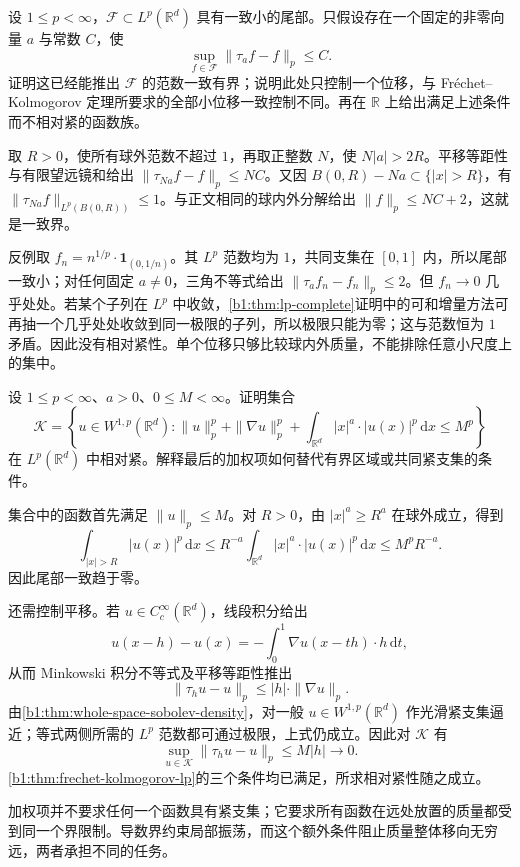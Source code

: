 \begin{exercise}\label{b1:ex:25-fk-redundant-boundedness}
设 \(1\le p<\infty\)，\(\mathcal F\subset L^p(\mathbb R^d)\) 具有一致小的尾部。只假设存在一个固定的非零向量 \(a\) 与常数 \(C\)，使
\[
 \sup_{f\in\mathcal F}\|\tau_af-f\|_p\le C.
\]
证明这已经能推出 \(\mathcal F\) 的范数一致有界；说明此处只控制一个位移，与 Fréchet–Kolmogorov 定理所要求的全部小位移一致控制不同。再在 \(\mathbb R\) 上给出满足上述条件而不相对紧的函数族。
\end{exercise}
\begin{solution}
取 \(R>0\)，使所有球外范数不超过 \(1\)，再取正整数 \(N\)，使 \(N|a|>2R\)。平移等距性与有限望远镜和给出
\(\|\tau_{Na}f-f\|_p\le NC\)。又因 \(B(0,R)-Na\subset\{|x|>R\}\)，有 \(\|\tau_{Na}f\|_{L^p(B(0,R))}\le1\)。与正文相同的球内外分解给出 \(\|f\|_p\le NC+2\)，这就是一致界。

反例取 \(f_n=n^{1/p}\cdot\mathbf1_{(0,1/n)}\)。其 \(L^p\) 范数均为 \(1\)，共同支集在 \([0,1]\) 内，所以尾部一致小；对任何固定 \(a\ne0\)，三角不等式给出 \(\|\tau_af_n-f_n\|_p\le2\)。但 \(f_n\to0\) 几乎处处。若某个子列在 \(L^p\) 中收敛，\cref{b1:thm:lp-complete}证明中的可和增量方法可再抽一个几乎处处收敛到同一极限的子列，所以极限只能为零；这与范数恒为 \(1\) 矛盾。因此没有相对紧性。单个位移只够比较球内外质量，不能排除任意小尺度上的集中。
\end{solution}

\begin{exercise}\label{b1:ex:25-weighted-confinement}
设 \(1\le p<\infty\)、\(a>0\)、\(0\le M<\infty\)。证明集合
\[
 \mathcal K=\left\{u\in W^{1,p}(\mathbb R^d):
   \|u\|_p^p+\|\nabla u\|_p^p+
        \int_{\mathbb R^d}|x|^a\cdot|u(x)|^p\,\mathrm dx
                               \le M^p\right\}
\]
在 \(L^p(\mathbb R^d)\) 中相对紧。解释最后的加权项如何替代有界区域或共同紧支集的条件。
\end{exercise}
\begin{solution}
集合中的函数首先满足 \(\|u\|_p\le M\)。对 \(R>0\)，由
\(|x|^a\ge R^a\) 在球外成立，得到
\[
 \int_{|x|>R}|u(x)|^p\,\mathrm dx
 \le R^{-a}\int_{\mathbb R^d}|x|^a\cdot|u(x)|^p\,\mathrm dx
 \le M^pR^{-a}.
\]
因此尾部一致趋于零。

还需控制平移。若 \(u\in C_c^\infty(\mathbb R^d)\)，线段积分给出
\[
 u(x-h)-u(x)
       =-\int_0^1\nabla u(x-th)\cdot h\,\mathrm dt,
\]
从而 Minkowski 积分不等式及平移等距性推出
\[
 \|\tau_hu-u\|_p\le|h|\cdot\|\nabla u\|_p.
\]
由\cref{b1:thm:whole-space-sobolev-density}，对一般
\(u\in W^{1,p}(\mathbb R^d)\) 作光滑紧支集逼近；等式两侧所需的
\(L^p\) 范数都可通过极限，上式仍成立。因此对 \(\mathcal K\) 有
\[
 \sup_{u\in\mathcal K}\|\tau_hu-u\|_p\le M|h|\longrightarrow0.
\]
\cref{b1:thm:frechet-kolmogorov-lp}的三个条件均已满足，所求相对紧性随之成立。

加权项并不要求任何一个函数具有紧支集；它要求所有函数在远处放置的质量都受到同一个界限制。导数界约束局部振荡，而这个额外条件阻止质量整体移向无穷远，两者承担不同的任务。
\end{solution}

